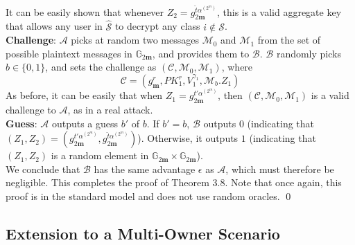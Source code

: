 \noindent It can be easily shown that whenever $Z_2=g^{\hat{t}\alpha^{(2^m)}}_{2\mathbf{m}}$, this is a valid aggregate key that allows any user in $\hat{\mathcal{S}}$ to decrypt any class $i\notin\mathcal{S}$.\\

\noindent \textbf{Challenge}: $\mathcal{A}$ picks at random two messages $\mathcal{M}_0$ and $\mathcal{M}_1$ from the set of possible plaintext messages in $\mathbb{G}_{2\mathbf{m}}$, and provides them to $\mathcal{B}$. $\mathcal{B}$ randomly picks $b\in\{0,1\}$, and sets the challenge as $(\mathcal{C},\mathcal{M}_0,\mathcal{M}_1)$, where 
\begin{equation}
 \mathcal{C}=(g^{r}_{\mathbf{m}},PK^r_1,V^{\gamma_1}_1,\mathcal{M}_b.Z_1) \nonumber
\end{equation}
\noindent As before, it can be easily that when $Z_1=g^{t'\alpha^{(2^m)}}_{2\mathbf{m}}$, then $(\mathcal{C},\mathcal{M}_0,\mathcal{M}_1)$ is a valid challenge to $\mathcal{A}$, as in a real attack. \\

\noindent \textbf{Guess}: $\mathcal{A}$ outputs a guess $b'$ of $b$. If $b' = b$, $\mathcal{B}$ outputs $0$ (indicating that $(Z_1,Z_2)=\left(g^{t'\alpha^{(2^m)}}_{2\mathbf{m}},g^{\hat{t}\alpha^{(2^m)}}_{2\mathbf{m}}\right)$). Otherwise, it outputs $1$ (indicating that $(Z_1,Z_2)$ is a random element in $\mathbb{G}_{2\mathbf{m}}\times\mathbb{G}_{2\mathbf{m}}$).\\ 

\noindent We conclude that $\mathcal{B}$ has the same advantage $\epsilon$ as $\mathcal{A}$, which must therefore be negligible. This completes the proof of Theorem 3.8. Note that once again, this proof is in the standard model and does not use random oracles. \hfill\qed 





\subsection{Extension to a Multi-Owner Scenario}
\label{subsec:multiownerKAC}

